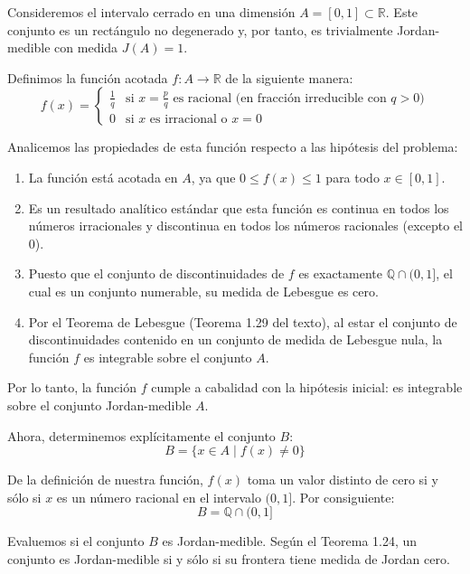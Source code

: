 \documentclass[11pt,letterpaper]{article}
\begin{document}
Consideremos el intervalo cerrado en una dimensión $A = [0, 1] \subset \mathbb{R}$. Este conjunto es un rectángulo no degenerado y, por tanto, es trivialmente Jordan-medible con medida $J(A) = 1$.

Definimos la función acotada $f: A \rightarrow \mathbb{R}$ de la siguiente manera:
\begin{equation*}
f(x) = 
\begin{cases} 
\frac{1}{q} & \text{si } x = \frac{p}{q} \text{ es racional (en fracción irreducible con } q > 0) \\ 
0 & \text{si } x \text{ es irracional o } x = 0
\end{cases}
\end{equation*}

Analicemos las propiedades de esta función respecto a las hipótesis del problema:
\begin{enumerate}
    \item La función está acotada en $A$, ya que $0 \le f(x) \le 1$ para todo $x \in [0,1]$.
    \item Es un resultado analítico estándar que esta función es continua en todos los números irracionales y discontinua en todos los números racionales (excepto el $0$).
    \item Puesto que el conjunto de discontinuidades de $f$ es exactamente $\mathbb{Q} \cap (0,1]$, el cual es un conjunto numerable, su medida de Lebesgue es cero.
    \item Por el Teorema de Lebesgue (Teorema 1.29 del texto), al estar el conjunto de discontinuidades contenido en un conjunto de medida de Lebesgue nula, la función $f$ es integrable sobre el conjunto $A$.
\end{enumerate}

Por lo tanto, la función $f$ cumple a cabalidad con la hipótesis inicial: es integrable sobre el conjunto Jordan-medible $A$.

Ahora, determinemos explícitamente el conjunto $B$:
\begin{equation*}
B = \{x \in A \mid f(x) \neq 0\}
\end{equation*}

De la definición de nuestra función, $f(x)$ toma un valor distinto de cero si y sólo si $x$ es un número racional en el intervalo $(0,1]$. Por consiguiente:
\begin{equation*}
B = \mathbb{Q} \cap (0, 1]
\end{equation*}

Evaluemos si el conjunto $B$ es Jordan-medible. Según el Teorema 1.24, un conjunto es Jordan-medible si y sólo si su frontera tiene medida de Jordan cero. 
\end{document}
